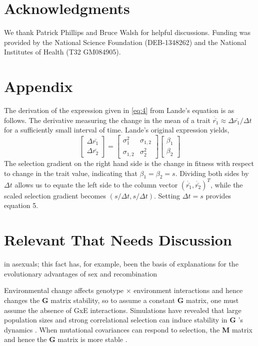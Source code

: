 \documentclass[9pt,twocolumn,twoside]{gsajnl}
\newcommand{\G}{\textbf{G }}
\newcommand{\M}{\textbf{M }}
\begin{document}

\section*{Acknowledgments}
\label{sec:acknowledgments}
We thank Patrick Phillips and Bruce Walsh for helpful discussions. Funding was provided by the National Science Foundation (DEB-1348262) and the National Institutes of Health (T32 GM084905).


\section*{Appendix}
The derivation of the expression given in \ref{eq:4} from Lande's equation is as follows. The derivative measuring the change in the mean of a trait $\dot{\bar{r_1}} \approx \Delta \bar{r_1}/\Delta t$ for a sufficiently small interval of time. Lande's original expression yields,
\[
\left[
\begin{array}{c}
\Delta \bar{r_1} \\
\Delta \bar{r_2} 
\end{array}
\right]
=
\left[
\begin{array}{cc}
\sigma_1^2 & \sigma_{1,2} \\
\sigma_{1,2} & \sigma_2^2 
\end{array}
\right]
\left[
\begin{array}{c}
\beta_1 \\
\beta_2 
\end{array}
\right]
\]
The selection gradient on the right hand side is the change in fitness with respect to change in the trait value, indicating that $\beta_1=\beta_2=s$. Dividing both sides by $\Delta t$ allows us to equate the left side to the column vector $(\dot{\bar{r_1}},\dot{\bar{r_2}})^T$, while the scaled selection gradient becomes $(s/\Delta t,s/\Delta t)$. Setting $\Delta t = s$ provides equation 5.   

\section{Relevant That Needs Discussion}
in asexuals; this fact has, for example, been the basis of explanations for the evolutionary advantages of sex and recombination \citep{Barton2005,Otto2009}

Environmental change affects genotype $\times$ environment interactions and hence changes the \G matrix stability, so to assume a constant \G matrix, one must assume the absence of GxE interactions. Simulations have revealed that large population sizes and strong correlational selection can induce stability in \G's dynamics \cite{Jones2003}. When mutational covariances can respond to selection, the \M matrix and hence the \G matrix is more stable \cite{Jones2007}. 
\end{document}
